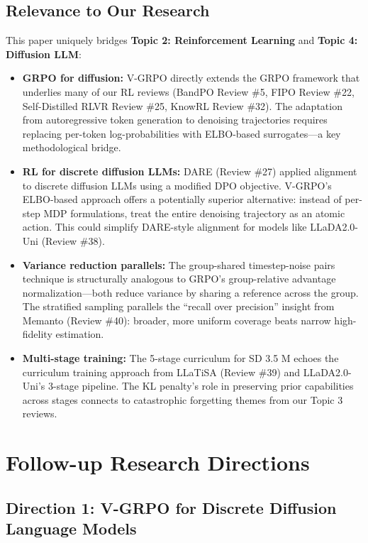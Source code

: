 \documentclass[11pt]{article}
\begin{document}
\subsection{Relevance to Our Research}

This paper uniquely bridges \textbf{Topic 2: Reinforcement Learning} and \textbf{Topic 4: Diffusion LLM}:

\begin{itemize}
    \item \textbf{GRPO for diffusion:} V-GRPO directly extends the GRPO framework that underlies many of our RL reviews (BandPO Review \#5, FIPO Review \#22, Self-Distilled RLVR Review \#25, KnowRL Review \#32). The adaptation from autoregressive token generation to denoising trajectories requires replacing per-token log-probabilities with ELBO-based surrogates---a key methodological bridge.
    \item \textbf{RL for discrete diffusion LLMs:} DARE (Review \#27) applied alignment to discrete diffusion LLMs using a modified DPO objective. V-GRPO's ELBO-based approach offers a potentially superior alternative: instead of per-step MDP formulations, treat the entire denoising trajectory as an atomic action. This could simplify DARE-style alignment for models like LLaDA2.0-Uni (Review \#38).
    \item \textbf{Variance reduction parallels:} The group-shared timestep-noise pairs technique is structurally analogous to GRPO's group-relative advantage normalization---both reduce variance by sharing a reference across the group. The stratified sampling parallels the ``recall over precision'' insight from Memanto (Review \#40): broader, more uniform coverage beats narrow high-fidelity estimation.
    \item \textbf{Multi-stage training:} The 5-stage curriculum for SD 3.5 M echoes the curriculum training approach from LLaTiSA (Review \#39) and LLaDA2.0-Uni's 3-stage pipeline. The KL penalty's role in preserving prior capabilities across stages connects to catastrophic forgetting themes from our Topic 3 reviews.
\end{itemize}

\section{Follow-up Research Directions}

\subsection{Direction 1: V-GRPO for Discrete Diffusion Language Models}
\end{document}
